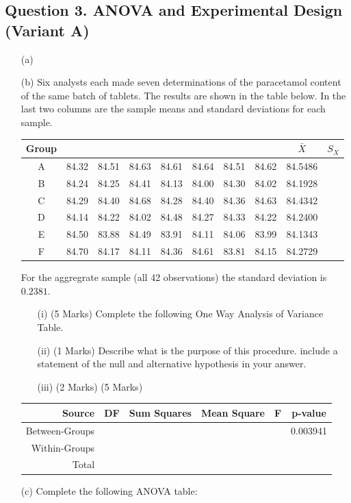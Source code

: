 \documentclass[a4paper,12pt]{article}
\begin{document}
\newpage
\subsection*{Question 3. ANOVA and Experimental Design (Variant A)}


\begin{itemize}
	\item[(a)] 

\item[(b)] Six analysts each made seven determinations of the paracetamol content of the same batch of tablets.
The results are shown in the table below. In the last two columns are the sample means and standard deviations for each sample.\\
\bigskip

\begin{tabular}{|c|ccccccc|c|c|}
\hline
Group &  & &  &  &  &  &  & $\bar{X}$& $S_{X}$ \\ \hline
A & 84.32 & 84.51 & 84.63 & 84.61 & 84.64 & 84.51 & 84.62 & 84.5486 & \\ \hline
B & 84.24 & 84.25 & 84.41 & 84.13 & 84.00 & 84.30 & 84.02 & 84.1928 & \\ \hline
C & 84.29 & 84.40 & 84.68 & 84.28 & 84.40 & 84.36 & 84.63 & 84.4342 & \\ \hline
D & 84.14 & 84.22 & 84.02 & 84.48 & 84.27 & 84.33 & 84.22 & 84.2400 & \\ \hline
E & 84.50 & 83.88 & 84.49 & 83.91 & 84.11 & 84.06 & 83.99 & 84.1343 & \\ \hline
F & 84.70 & 84.17 & 84.11 & 84.36 & 84.61 & 83.81 & 84.15 & 84.2729 & \\ \hline
\end{tabular} 


\bigskip

For the aggregrate sample (all 42 observations) the standard deviation is $0.2381$.

\begin{itemize}
\item[(i)] (5 Marks) Complete the following One Way Analysis of Variance Table.
\item[(ii)] (1 Marks) Describe what is the purpose of this procedure. include a statement of the null and alternative hypothesis in your answer.
\item[(iii)] (2 Marks) (5 Marks)
\end{itemize}
\begin{tabular}{|r|c|c|c|c|c|}
	\hline Source  &\phantom{sp} DF \phantom{sp} & Sum Squares & Mean Square  & \phantom{sp} F \phantom{sp} & p-value  \\ 
	\hline Between-Groups &  &  &  &  & 0.003941 \\ 
	\hline Within-Groups &  &  &  &  &  \\ \hline
	\hline Total &  &  &  &  &  \\ 
	\hline 
\end{tabular} 
\newpage
\item[(c)] Complete the following ANOVA table:


\end{itemize}
\end{document}
